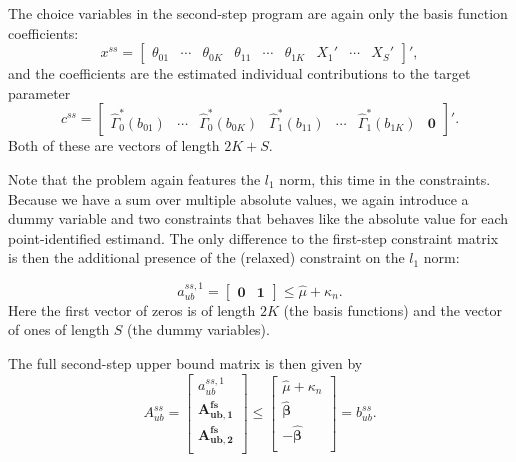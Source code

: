 \documentclass[12pt,a4paper,english]{article} %
\numberwithin{equation}{section}
\theoremstyle{definition}
\theoremstyle{remark}
\theoremstyle{plain}
\begin{document}
The choice variables in the second-step program are again only the basis function coefficients:
\begin{equation*}
  x^{ss} =
  \begin{bmatrix}
     \theta_{01} & \cdots & \theta_{0K} & \theta_{11} & \cdots & \theta_{1K} & X_1' & \cdots & X_S'
  \end{bmatrix}',
\end{equation*}
and the coefficients are the estimated individual contributions to the target parameter
\begin{equation*}
  c^{ss} =
  \begin{bmatrix}
     \hat{\Gamma}_0^*(b_{01}) & \cdots & \hat{\Gamma}_0^*(b_{0K}) & \hat{\Gamma}_1^*(b_{11}) & \cdots & \hat{\Gamma}_1^*(b_{1K}) & \mathbf{0}
  \end{bmatrix}'.
\end{equation*}
Both of these are vectors of length $2K + S$.

Note that the problem again features the $l_1$ norm, this time in the constraints.
Because we have a sum over multiple absolute values, we again introduce a dummy variable and two constraints that behaves like the absolute value for each point-identified estimand.
The only difference to the first-step constraint matrix is then the additional presence of the (relaxed) constraint on the $l_1$ norm:

\begin{equation*}
  a_{ub}^{ss, 1} = \begin{bmatrix}
    \mathbf{0} & \mathbf{1}
  \end{bmatrix}
  \leq \hat{\mu} + \kappa_n.
\end{equation*}
Here the first vector of zeros is of length $2K$ (the basis functions) and the vector of ones of length $S$ (the dummy variables).

The full second-step upper bound matrix is then given by
\begin{equation*}
  A_{ub}^{ss} = \begin{bmatrix}
    a_{ub}^{ss, 1} \\
    \mathbf{A_{ub,1}^{fs}} \\
    \mathbf{A_{ub,2}^{fs}} \\
  \end{bmatrix}
  \leq
  \begin{bmatrix}
    \hat{\mu} + \kappa_n \\
    \mathbf{\hat{\beta}} \\
    - \mathbf{\hat{\beta}} \\
  \end{bmatrix}
  = b_{ub}^{ss}.
\end{equation*}
\end{document}
